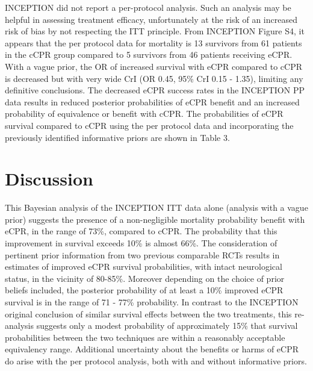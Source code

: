 \documentclass[
  super,
  preprint,
  3p]{elsarticle}
\begin{document}
INCEPTION did not report a per-protocol analysis. Such an analysis may
be helpful in assessing treatment efficacy, unfortunately at the risk of
an increased risk of bias by not respecting the ITT principle. From
INCEPTION Figure S4\citep{CPR2023a}, it appears that the per protocol
data for mortality is 13 survivors from 61 patients in the cCPR group
compared to 5 survivors from 46 patients receiving eCPR. With a vague
prior, the OR of increased survival with eCPR compared to cCPR is
decreased but with very wide CrI (OR 0.45, 95\% CrI 0.15 - 1.35),
limiting any definitive conclusions. The decreased eCPR success rates in
the INCEPTION PP data results in reduced posterior probabilities of eCPR
benefit and an increased probability of equivalence or benefit with
cCPR. The probabilities of eCPR survival compared to cCPR using the per
protocol data and incorporating the previously identified informative
priors are shown in Table 3.

\hypertarget{discussion}{%
\section{Discussion}\label{discussion}}

This Bayesian analysis of the INCEPTION ITT data alone (analysis with a
vague prior) suggests the presence of a non-negligible mortality
probability benefit with eCPR, in the range of 73\%, compared to cCPR.
The probability that this improvement in survival exceeds 10\% is almost
66\%. The consideration of pertinent prior information from two previous
comparable RCTs\citep{RN6751, RN6759} results in estimates of improved
eCPR survival probabilities, with intact neurological status, in the
vicinity of 80-85\%. Moreover depending on the choice of prior beliefs
included, the posterior probability of at least a 10\% improved eCPR
survival is in the range of 71 - 77\% probability. In contrast to the
INCEPTION original conclusion of similar survival effects between the
two treatments, this re-analysis suggests only a modest probability of
approximately 15\% that survival probabilities between the two
techniques are within a reasonably acceptable equivalency range.
Additional uncertainty about the benefits or harms of eCPR do arise with
the per protocol analysis, both with and without informative priors.
\end{document}
